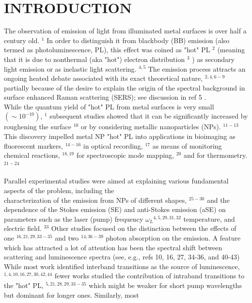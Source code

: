 \documentclass[10pt]{article}
\begin{document}
\section*{INTRODUCTION}
The observation of emission of light from illuminated metal surfaces is over half a century old. ${ }^{1}$ In order to distinguish it from blackbody (BB) emission (also termed as photoluminescence, PL), this effect was coined as "hot" PL ${ }^{2}$ (meaning that it is due to nonthermal (aka "hot") electron distribution ${ }^{3}$ ) as secondary light emission or as inelastic light scattering. ${ }^{4,5}$ The emission process attracts an ongoing heated debate associated with its exact theoretical nature, ${ }^{2,4,6-9}$ partially because of the desire to explain the origin of the spectral background in surface enhanced Raman scattering (SERS); see discussion in ref 5 .\\
While the quantum yield of "hot" PL from metal surfaces is very small $\left(\sim 10^{-10}\right)$, ${ }^{1}$ subsequent studies showed that it can be significantly increased by roughening the surface ${ }^{10}$ or by considering metallic nanoparticles (NPs). ${ }^{11-13}$ This discovery impelled metal NP "hot" PL into applications in bioimaging as fluorescent markers, ${ }^{14-16}$ in optical recording, ${ }^{17}$ as means of monitoring chemical reactions, ${ }^{18,19}$ for spectroscopic mode mapping, ${ }^{20}$ and for thermometry. ${ }^{21-24}$

Parallel experimental studies were aimed at explaining various fundamental aspects of the problem, including the\\
characterization of the emission from NPs of different shapes, ${ }^{25-30}$ and the dependence of the Stokes emission (SE) and anti-Stokes emission (aSE) on parameters such as the laser (pump) frequency $\omega_{L}{ }^{4,5,29,31,32}$ temperature, and electric field. ${ }^{33}$ Other studies focused on the distinction between the effects of one ${ }^{16,21,29,33-35}$ and two ${ }^{14,36-39}$ photon absorption on the emission. A feature which has attracted a lot of attention has been the spectral shift between scattering and luminescence spectra (see, e.g., refs 10, 16, 27, 34-36, and 40-43)\\
While most work identified interband transitions as the source of luminescence, ${ }^{1,4,10,16,27,30,42,44}$ fewer works studied the contribution of intraband transitions to the "hot" PL, ${ }^{5,21,28,29,33-35}$ which might be weaker for short pump wavelengths but dominant for longer ones. Similarly, most
\end{document}
